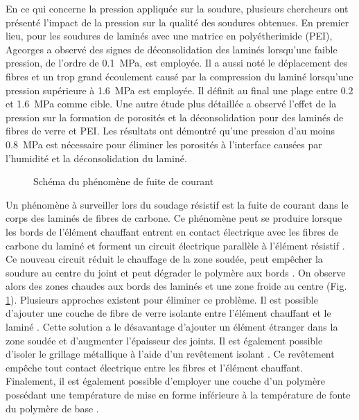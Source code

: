 En ce qui concerne la pression appliquée sur la soudure, plusieurs chercheurs ont présenté l'impact de la pression sur la qualité des soudures obtenues. 
En premier lieu, pour les soudures de laminés avec une matrice en polyétherimide (PEI), Ageorges \cite{Ageorges2000a} a observé des signes de déconsolidation des laminés lorsqu'une faible pression, de l'ordre de \SI{0.1}{\mega\pascal}, est employée.
Il a aussi noté le déplacement des fibres et un trop grand écoulement causé par la compression du laminé lorsqu'une pression supérieure à \SI{1.6}{\mega\pascal} est employée. 
Il définit au final une plage entre 0.2 et \SI{1.6}{\mega\pascal} comme cible. 
Une autre étude plus détaillée \cite{Shi2017} a observé l'effet de la pression sur la formation de porosités et la déconsolidation pour des laminés de fibres de verre et PEI. 
Les résultats ont démontré qu'une pression d'au moins \SI{0.8}{\mega\pascal} est nécessaire pour éliminer les porosités à l'interface causées par l'humidité et la déconsolidation du laminé. 

\begin{figure}[h]
	\centering
	
	\caption{Schéma du phénomène de fuite de courant}
	\label{fig:schema_fuite_de_courant}
\end{figure}

Un phénomène à surveiller lors du soudage résistif est la fuite de courant dans le corps des laminés de fibres de carbone. 
Ce phénomène peut se produire lorsque les bords de l'élément chauffant entrent en contact électrique avec les fibres de carbone du laminé et forment un circuit électrique parallèle à l'élément résistif \cite{Hou1999a,Ageorges2000}. 
Ce nouveau circuit réduit le chauffage de la zone soudée, peut empêcher la soudure au centre du joint et peut dégrader le polymère aux bords \cite{Dube2008}. 
On observe alors des zones chaudes aux bords des laminés et une zone froide au centre (Fig. \ref{fig:schema_fuite_de_courant}). 
Plusieurs approches existent pour éliminer ce problème. 
Il est possible d'ajouter une couche de fibre de verre isolante entre l'élément chauffant et le laminé \cite{Hou1999a}. 
Cette solution a le désavantage d'ajouter un élément étranger dans la zone soudée et d'augmenter l'épaisseur des joints. 
Il est également possible d'isoler le grillage métallique à l'aide d'un revêtement isolant \cite{Dube2008,Dube2009a}. 
Ce revêtement empêche tout contact électrique entre les fibres et l'élément chauffant. 
Finalement, il est également possible d'employer une couche d'un polymère possédant une température de mise en forme inférieure à la température de fonte du polymère de base \cite{Stavrov2005a}. 

